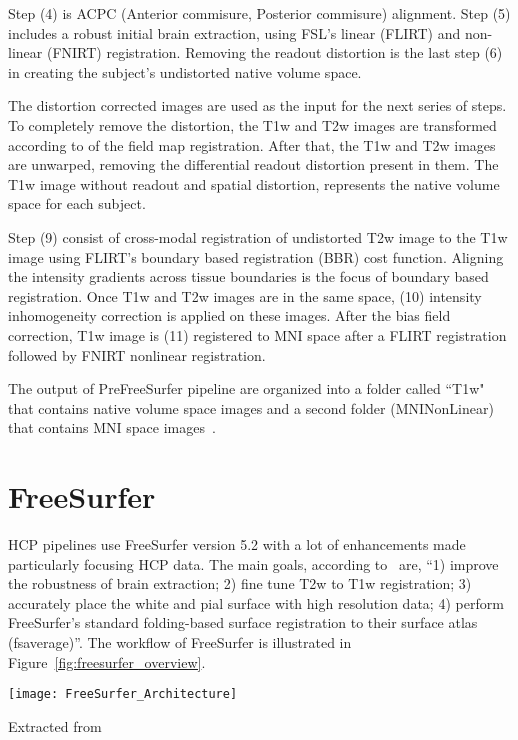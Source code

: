 \indent Step (4) is ACPC (Anterior commisure, Posterior commisure) alignment. Step (5) includes a robust initial brain extraction, using FSL's linear (FLIRT) and non-linear (FNIRT) registration. Removing the readout distortion is the last step (6) in creating the subject's undistorted native volume space. %

\indent The distortion corrected images are used as the input for the next series of steps. To completely remove the distortion, the T1w and T2w images are transformed according to of the field map registration. After that, the T1w and T2w images are unwarped, removing the differential readout distortion present in them. The T1w image without readout and spatial distortion, represents the native volume space for each subject.

\indent Step (9) consist of cross-modal registration of undistorted T2w image to the T1w image using FLIRT's boundary based registration (BBR) cost function. Aligning the intensity gradients across tissue boundaries is the focus of boundary based registration. Once T1w and T2w images are in the same space, (10) intensity inhomogeneity correction is applied on these images. After the bias field correction, T1w image is (11) registered to MNI space after a FLIRT registration followed by FNIRT nonlinear registration.

\indent The output of PreFreeSurfer pipeline are organized into a folder called ``T1w" that contains native volume space images and a second folder (MNINonLinear) that contains MNI space images~\cite{Gla13}.

\section{FreeSurfer} \label{sec:FreeSurfer}
HCP pipelines use FreeSurfer version 5.2 with a lot of enhancements made particularly focusing HCP data. The main goals, according to~\cite{Gla13} are, ``1) improve the robustness of brain extraction; 2) fine tune T2w to T1w registration; 3) accurately place the white and pial surface with high resolution data; 4) perform FreeSurfer's standard folding-based surface registration to their surface atlas (fsaverage)''. The workflow of FreeSurfer is illustrated in Figure~\ref{fig:freesurfer_overview}.

\begin{center}
  \texttt{[image: FreeSurfer\_Architecture]}
  \label{fig:freesurfer_overview}
  \caption*{Extracted from \cite{Gla13}}
\end{center}

